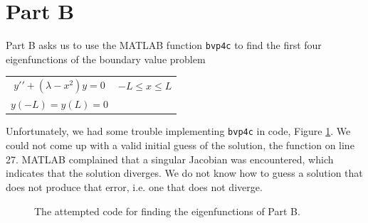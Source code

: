 \documentclass{article}
\begin{document}


\section*{Part B}

\qq Part B asks us to use the MATLAB function {\tt bvp4c} to find the first four
eigenfunctions of the boundary value problem

\begin{center}
\begin{tabular}{cc}
  \(y\prime\prime + (\lambda - x^2) y = 0\) & \(-L \leq x \leq L\) \\
  \(y(-L) = y(L) = 0\) & \\
\end{tabular}
\end{center}
\qq Unfortunately, we had some trouble
implementing {\tt bvp4c} in code, Figure \ref{cod:partB}. We could not come up
with a valid initial guess of the solution, the function on line 27. MATLAB
complained that a singular Jacobian was encountered, which indicates that the
solution diverges. We do not know how to guess a solution that does not produce
that error, i.e. one that does not diverge.

\begin{figure}[H]
  \begin{center}
    
  \end{center}
  \caption{The attempted code for finding the eigenfunctions of Part B.}
  \label{cod:partB}
\end{figure}

\end{document}
